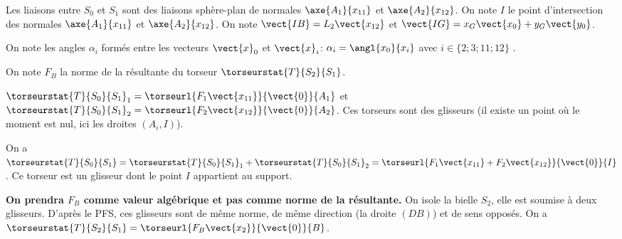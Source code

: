 Les liaisons entre $S_0$ et $S_1$ sont des liaisons sphère-plan de normales $\axe{A_1}{{x}_{11}}$ et $\axe{A_2}{{x}_{12}}$.
On note $I$ le point d’intersection des normales $\axe{A_1}{{x}_{11}}$ et $\axe{A_2}{{x}_{12}}$. On note $\vect{IB}=L_2\vect{x_{12}}$ et $\vect{IG}=x_G\vect{x_{0}}+y_G\vect{y_{0}}$.





On note les angles $\alpha_i$ formés entre les vecteurs $\vect{x}_0$ et $\vect{x}_i$: $\alpha_i=\angl{{x}_0}{{x}_i}$ avec $i\in \{2;3;11;12\}$ .


\fi

\ifnormal
\else
On note $F_B$ la norme de la résultante du torseur $\torseurstat{T}{S_2}{S_1}$. 
\fi



\ifnormal
{}
\else
\fi


\ifprof
\begin{corrige}
$\torseurstat{T}{S_0}{S_1}_1=\torseurl{F_1\vect{x_{11}}}{\vect{0}}{A_1}$
et 
$\torseurstat{T}{S_0}{S_1}_2=\torseurl{F_2\vect{x_{12}}}{\vect{0}}{A_2}$. 
Ces torseurs sont des glisseurs (il existe un point où le moment est nul, ici les droites $(A_i,I)$). 
\end{corrige}
\else
\fi

\ifnormal
{}
\else
\fi

\ifprof
\begin{corrige}
On a $\torseurstat{T}{S_0}{S_1}=\torseurstat{T}{S_0}{S_1}_1+\torseurstat{T}{S_0}{S_1}_2=\torseurl{F_1\vect{x_{11}}+F_2\vect{x_{12}}}{\vect{0}}{I}$. Ce torseur est un glisseur dont le point $I$ appartient au support. 
\end{corrige}
\else
\fi

\ifnormal
{}
\else
\fi


\ifprof
\begin{corrige}
\textbf{On prendra $F_B$ comme valeur algébrique et pas comme norme de la résultante.}
On isole la bielle $S_2$, elle est soumise à deux glisseurs. D'après le PFS, ces glisseurs sont de même norme, de même direction  (la droite $(DB)$) et de sens opposés. 
On a $\torseurstat{T}{S_2}{S_1}=\torseurl{ F_B\vect{x_{2}}}{\vect{0}}{B}$.
\end{corrige}
\else
\fi


